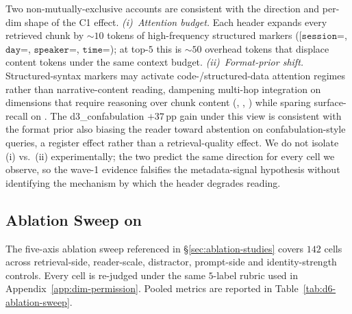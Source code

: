 Two non-mutually-exclusive accounts are consistent with the
direction and per-dim shape of the C1 effect. \emph{(i)~Attention
budget.} Each header expands every retrieved chunk by ${\sim}10$
tokens of high-frequency structured markers ($\texttt{[session=}$,
$\texttt{day=}$, $\texttt{speaker=}$, $\texttt{time=}$); at top-$5$
this is ${\sim}50$ overhead tokens that displace content tokens
under the same context budget. \emph{(ii)~Format-prior shift.}
Structured-syntax markers may activate code-/structured-data
attention regimes rather than narrative-content reading, dampening
multi-hop integration on dimensions that require reasoning over
chunk content (\DFourID, \DSixID, \DThreeID) while sparing
surface-recall on \DOneID. The d3\_confabulation $+37$\,pp gain
under this view is consistent with the format prior also biasing
the reader toward abstention on confabulation-style queries, a
register effect rather than a retrieval-quality effect. We do
not isolate (i) vs.\ (ii) experimentally; the two predict the
same direction for every cell we observe, so the wave-1 evidence
falsifies the metadata-signal hypothesis without identifying the
mechanism by which the header degrades reading.




\subsection{Ablation Sweep on \DSixID}
\label{app:retrieval-sweep}

The five-axis ablation sweep referenced in \S\ref{sec:ablation-studies}
covers $142$ \DSixID cells across retrieval-side, reader-scale,
distractor, prompt-side and identity-strength controls. Every cell is
re-judged under the same $5$-label rubric used in
Appendix~\ref{app:dim-permission}. Pooled metrics are reported in
Table~\ref{tab:d6-ablation-sweep}.



